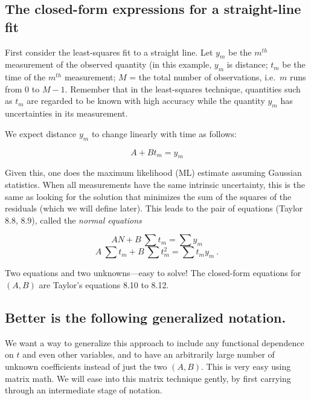 \documentclass[psfig,preprint]{aastex}
\begin{document}
\subsection{The closed-form expressions for a straight-line fit}

	First consider the least-squares fit to a straight line.  Let
$y_m$ be the $m^{th}$ measurement of the observed quantity (in this
example, $y_m$ is distance; $t_m$ be the time of the
$m^{th}$ measurement; $M$ = the total number of observations, i.e.\ $m$
runs from 0 to $M-1$.  Remember that in the least-squares technique,
quantities such as $t_m$ are regarded to be known with high accuracy
while the quantity $y_m$ has uncertainties in its measurement. 

	We expect distance $y_m$ to change linearly with
time as follows:

\begin{equation} \label{one}
A + B t_m = y_m
\end{equation}

\noindent Given this, one does the maximum likelihood (ML) estimate assuming
Gaussian statistics. When all measurements have the same intrinsic
uncertainty, this is the same as looking for the solution that minimizes
the sum of the squares of the residuals (which we will define later). 
This leads to the pair of equations (Taylor 8.8, 8.9), called the {\it
normal equations}

\begin{mathletters} \label{normalone}
\begin{equation}
AN + B \ \sum t_m = \sum y_m
\end{equation}
\begin{equation}
A \ \sum t_m + B \ \sum t_m^2 = \sum t_m y_m \ .
\end{equation}
\end{mathletters}

\noindent Two equations and two unknowns---easy to solve! The
closed-form equations for $(A,B)$ are Taylor's equations 8.10 to 8.12.

\subsection{Better is the following generalized notation.}

	We want a way to generalize this approach to include any
functional dependence on $t$ and even other variables, and to have an
arbitrarily large number of unknown coefficients instead of just the two
$(A,B)$. This is very easy using matrix math.  We will ease into this
matrix technique gently, by first  carrying through an intermediate
stage of notation. 
\end{document}
